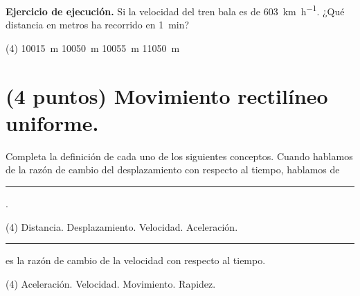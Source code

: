 \documentclass[12pt, letter]{exam}
\begin{document}
\begin{questions}
    \question \label{Ejercicio_01} \textbf{Ejercicio de ejecución.} Si la velocidad del tren bala es de \SI{603}{\kilo\meter\per\hour}. ¿Qué distancia en metros ha recorrido en \SI{1}{\minute}?
    \begin{tasks}(4)
        \task \SI{10015}{\meter}
        \task \SI{10050}{\meter}
        \task \SI{10055}{\meter}
        \task \SI{11050}{\meter}
    \end{tasks}

    \section{(4 puntos) Movimiento rectilíneo uniforme.}

    Completa la definición de cada uno de los siguientes conceptos.
    \question Cuando hablamos de la razón de cambio del desplazamiento con respecto al tiempo, hablamos de  \rule{2cm}{0.1mm}.
    \begin{tasks}(4)
        \task Distancia.
        \task Desplazamiento.
        \task Velocidad.
        \task Aceleración.
    \end{tasks}
    \question \rule{1.5cm}{0.1mm} es la razón de cambio de la velocidad con respecto al tiempo.
    \begin{tasks}(4)
        \task Aceleración.
        \task Velocidad.
        \task Movimiento.
        \task Rapidez.
    \end{tasks}


\end{questions}
\end{document}
